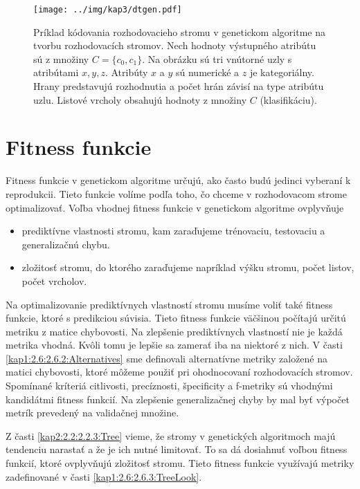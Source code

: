 \begin{figure}[h]
\centering
\centerline{\mbox{\texttt{[image: ../img/kap3/dtgen.pdf]}}}
\caption{Príklad kódovania rozhodovacieho stromu v genetickom algoritme na tvorbu rozhodovacích stromov. Nech hodnoty výstupného atribútu sú z množiny $C=\{c_0,c_1\}$. Na obrázku sú tri vnútorné uzly s atribútami $x,y,z$. Atribúty $x$ a $y$ sú numerické a $z$ je kategoriálny. Hrany predstavujú rozhodnutia a počet hrán závisí na type atribútu uzlu. Listové vrcholy obsahujú hodnoty z množiny $C$ (klasifikáciu).}\label{fig:DTEncode}
\end{figure}

\section{Fitness funkcie}\label{kap3:3.3:Fitness}
Fitness funkcie v genetickom algoritme určujú, ako často budú jedinci vyberaní k reprodukcii. Tieto funkcie volíme podľa toho, čo chceme v rozhodovacom strome optimalizovať. Voľba vhodnej fitness funkcie v genetickom algoritme ovplyvňuje
\begin{itemize}
\item prediktívne vlastnosti stromu, kam zaraďujeme trénovaciu, testovaciu a generalizačnú chybu. 
\item zložitosť stromu, do ktorého zaraďujeme napríklad výšku stromu, počet listov, počet vrcholov.
\end{itemize} 

Na optimalizovanie prediktívnych vlastností stromu musíme voliť také fitness funkcie, ktoré s predikciou súvisia. Tieto fitness funkcie väčšinou počítajú určitú metriku z matice chybovosti. Na zlepšenie prediktívnych vlastností nie je každá metrika vhodná. Kvôli tomu je lepšie sa zamerať iba na niektoré z nich.
V časti \ref{kap1:2.6:2.6.2:Alternatives} sme definovali alternatívne metriky založené na matici chybovosti, ktoré môžeme použiť pri ohodnocovaní rozhodovacích stromov. Spomínané kríteriá citlivosti, precíznosti, špecificity a f-metriky sú vhodnými kandidátmi fitness funkcií. Na zlepšenie generalizačnej chyby by mal byť výpočet metrík prevedený na validačnej množine.

Z časti \ref{kap2:2.2:2.2.3:Tree} vieme, že stromy v genetických algoritmoch majú tendenciu narastať a že je ich nutné limitovať. To sa dá dosiahnuť voľbou fitness funkcií, ktoré ovplyvňujú zložitosť stromu. Tieto fitness funkcie využívajú metriky zadefinované v časti \ref{kap1:2.6:2.6.3:TreeLook}.

